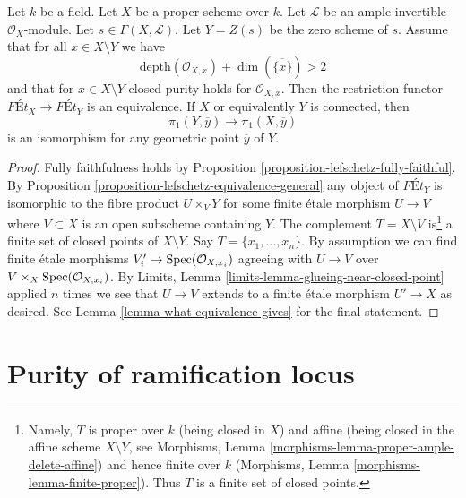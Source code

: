 \begin{proposition}
\label{proposition-lefschetz-equivalence}
Let $k$ be a field. Let $X$ be a proper scheme over $k$.
Let $\mathcal{L}$ be an ample invertible $\mathcal{O}_X$-module.
Let $s \in \Gamma(X, \mathcal{L})$. Let $Y = Z(s)$ be the
zero scheme of $s$.
Assume that for all $x \in X \setminus Y$ we have
$$
\text{depth}(\mathcal{O}_{X, x}) + \dim(\overline{\{x\}}) > 2
$$
and that for $x \in X \setminus Y$ closed purity holds for
$\mathcal{O}_{X, x}$. Then the restriction functor
$\textit{F\'Et}_X \to \textit{F\'Et}_Y$
is an equivalence. If $X$ or equivalently $Y$ is connected, then
$$
\pi_1(Y, \overline{y}) \to \pi_1(X, \overline{y})
$$
is an isomorphism for any geometric point $\overline{y}$ of $Y$.
\end{proposition}

\begin{proof}
Fully faithfulness holds by
Proposition \ref{proposition-lefschetz-fully-faithful}.
By Proposition \ref{proposition-lefschetz-equivalence-general}
any object of $\textit{F\'Et}_Y$
is isomorphic to the fibre product $U \times_V Y$ for some
finite \'etale morphism $U \to V$ where $V \subset X$
is an open subscheme containing $Y$.
The complement $T = X \setminus V$
is\footnote{Namely, $T$ is proper over $k$ (being closed in $X$)
and affine (being closed in the affine scheme $X \setminus Y$, see
Morphisms, Lemma \ref{morphisms-lemma-proper-ample-delete-affine})
and hence finite over $k$
(Morphisms, Lemma \ref{morphisms-lemma-finite-proper}).
Thus $T$ is a finite set of closed points.}
a finite set of closed points of $X \setminus Y$.
Say $T = \{x_1, \ldots, x_n\}$.
By assumption we can find finite \'etale morphisms
$V'_i \to \mathop{\mathrm{Spec}}(\mathcal{O}_{X, x_i})$ agreeing with
$U \to V$ over $V \times_X \mathop{\mathrm{Spec}}(\mathcal{O}_{X, x_i})$.
By Limits, Lemma \ref{limits-lemma-glueing-near-closed-point}
applied $n$ times we see that $U \to V$ extends to a finite \'etale
morphism $U' \to X$ as desired.
See Lemma \ref{lemma-what-equivalence-gives} for the final statement.
\end{proof}










\section{Purity of ramification locus}
\label{section-purity-ramification}

